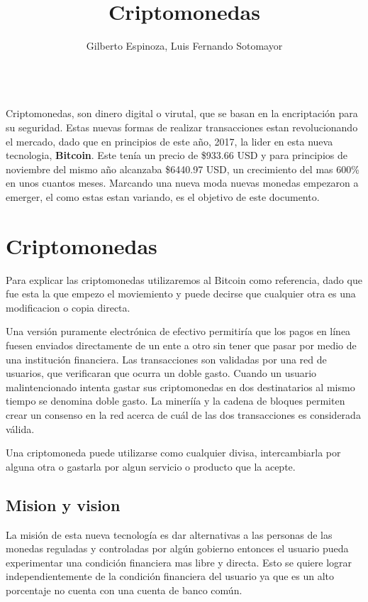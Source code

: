 \documentclass[12pt,letterpaper]{article}
\title{Criptomonedas}
\author{Gilberto Espinoza, Luis Fernando Sotomayor}
\begin{document}
\maketitle
\abstractname{\\Criptomonedas, son dinero digital o virutal, que se basan en la encriptaci\'on para su seguridad. Estas nuevas formas de realizar transacciones estan revolucionando el mercado, dado que en principios de este a\~no, 2017, la lider en esta nueva tecnologia, \textbf{Bitcoin}. Este ten\'ia un precio de \$933.66 USD y para principios de noviembre del mismo a\~no alcanzaba \$6440.97 USD, un crecimiento del mas 600\% en unos cuantos meses. Marcando una nueva moda nuevas monedas empezaron a emerger, el como estas estan variando, es el objetivo de este documento. }

\section*{Criptomonedas}
	Para explicar las criptomonedas utilizaremos al Bitcoin como referencia, dado que fue esta la que empezo el moviemiento y puede decirse que cualquier otra es una modificacion o copia directa.

	Una versi\'on puramente electr\'onica de efectivo permitir\'ia que los pagos en l\'inea fuesen enviados directamente de un ente a otro sin tener que pasar por medio de una instituci\'on financiera. Las transacciones son validadas por una red de usuarios, que verificaran que ocurra un doble gasto. Cuando un usuario malintencionado intenta gastar sus criptomonedas en dos destinatarios al mismo tiempo se denomina doble gasto. La miner\'i\'ia y la cadena de bloques permiten crear un consenso en la red acerca de cu\'al de las dos transacciones es considerada v\'alida.
	
	Una criptomoneda puede utilizarse como cualquier divisa, intercambiarla por alguna otra o gastarla por algun servicio o producto que la acepte.
	\subsection*{Mision y vision}
	La misi\'on de esta nueva tecnolog\'ia es dar alternativas a las personas de las monedas reguladas y controladas por alg\'un gobierno entonces el usuario pueda experimentar una condici\'on financiera mas libre y directa. Esto se quiere lograr independientemente de la condici\'on financiera del usuario ya que es un alto porcentaje no cuenta con una cuenta de banco com\'un.
	
\end{document}
